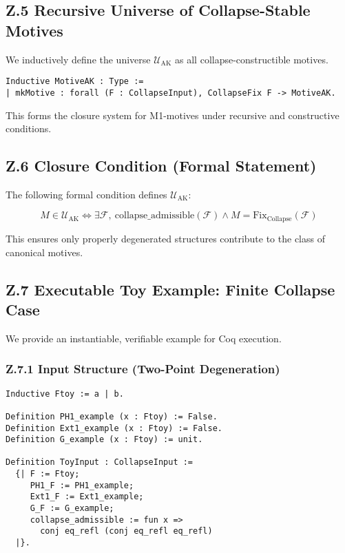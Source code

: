 \documentclass[11pt]{article}
\begin{document}
\subsection*{Z.5 Recursive Universe of Collapse-Stable Motives}

We inductively define the universe $\mathcal{U}_{\mathrm{AK}}$ as all collapse-constructible motives.

\begin{lstlisting}[language=Coq, caption=Recursive Motive Universe]
Inductive MotiveAK : Type :=
| mkMotive : forall (F : CollapseInput), CollapseFix F -> MotiveAK.
\end{lstlisting}

This forms the closure system for M1-motives under recursive and constructive conditions.

\subsection*{Z.6 Closure Condition (Formal Statement)}

The following formal condition defines $\mathcal{U}_{\mathrm{AK}}$:

\[
M \in \mathcal{U}_{\mathrm{AK}} \iff \exists \mathcal{F},\
\mathrm{collapse\_admissible}(\mathcal{F}) \land M = \mathrm{Fix}_{\mathrm{Collapse}}(\mathcal{F})
\]

This ensures only properly degenerated structures contribute to the class of canonical motives.

\subsection*{Z.7 Executable Toy Example: Finite Collapse Case}

We provide an instantiable, verifiable example for Coq execution.

\subsubsection*{Z.7.1 Input Structure (Two-Point Degeneration)}

\begin{lstlisting}[language=Coq, caption=Toy Input Definition]
Inductive Ftoy := a | b.

Definition PH1_example (x : Ftoy) := False.
Definition Ext1_example (x : Ftoy) := False.
Definition G_example (x : Ftoy) := unit.

Definition ToyInput : CollapseInput :=
  {| F := Ftoy;
     PH1_F := PH1_example;
     Ext1_F := Ext1_example;
     G_F := G_example;
     collapse_admissible := fun x =>
       conj eq_refl (conj eq_refl eq_refl)
  |}.
\end{lstlisting}
\end{document}
